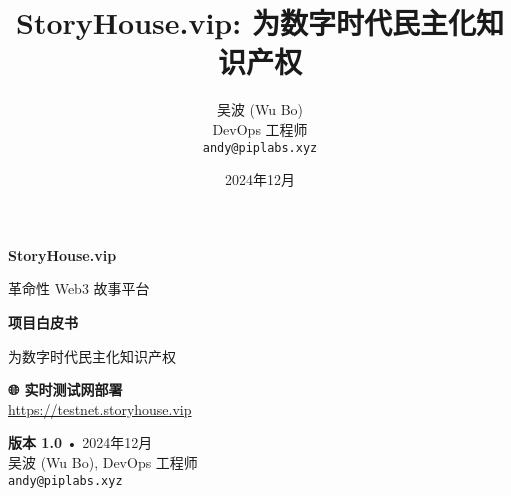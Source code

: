 \documentclass[12pt,a4paper]{article}
\title{StoryHouse.vip: 为数字时代民主化知识产权}
\author{吴波 (Wu Bo) \\ DevOps 工程师 \\ \texttt{andy@piplabs.xyz}}
\date{2024年12月}
\begin{document}
\begin{titlepage}
    \centering
    \vspace*{2cm}
    
    \textcolor{storyblue}{\Huge \textbf{StoryHouse.vip}}
    
    \vspace{1cm}
    \textcolor{storygray}{\Large 革命性 Web3 故事平台}
    
    \vspace{2cm}
    {\huge \textbf{项目白皮书}}
    
    \vspace{0.5cm}
    {\Large \textcolor{storygray}{为数字时代民主化知识产权}}
    
    \vspace{2cm}
    
    \begin{center}
    \end{center}
    
    \vspace{2cm}
    
    \begin{center}
    \textcolor{storygreen}{\textbf{🌐 实时测试网部署}}\\
    \textcolor{storygray}{\url{https://testnet.storyhouse.vip}}
    \end{center}
    
    \vfill
    
    \begin{center}
    \textcolor{storygray}{
        \textbf{版本 1.0} • 2024年12月 \\
        吴波 (Wu Bo), DevOps 工程师 \\
        \texttt{andy@piplabs.xyz}
    }
    \end{center}
    
    \vspace{1cm}
\end{titlepage}
\end{document}
